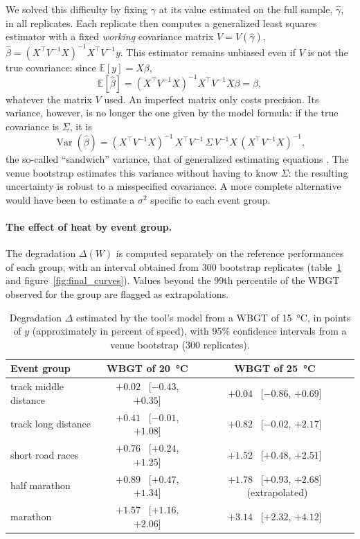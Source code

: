 \documentclass[11pt,a4paper]{article}
\newcommand{\E}{\mathbb{E}}
\DeclareMathOperator{\Var}{Var}
\begin{document}
We solved this difficulty by fixing $\gamma$ at its value estimated on the full sample, $\hat\gamma$, in all replicates.
Each replicate then computes a generalized least squares estimator with a fixed \emph{working} covariance matrix
$V = V(\hat\gamma)$, $\hat\beta = (X^\top V^{-1} X)^{-1} X^\top V^{-1} y$. This estimator remains unbiased even if $V$ is
not the true covariance: since $\E[y] = X\beta$,
\[
\E[\hat\beta] = (X^\top V^{-1} X)^{-1} X^\top V^{-1} X\beta = \beta,
\]
whatever the matrix $V$ used. An imperfect matrix only costs precision. Its variance, however, is no longer the one given
by the model formula: if the true covariance is $\Sigma$, it is
\[
\Var(\hat\beta) = (X^\top V^{-1} X)^{-1}\,X^\top V^{-1}\,\Sigma\,V^{-1} X\,(X^\top V^{-1} X)^{-1},
\]
the so-called ``sandwich'' variance, that of generalized estimating equations \citep{liang1986}. The venue bootstrap
estimates this variance without having to know $\Sigma$: the resulting uncertainty is robust to a misspecified
covariance. A more complete alternative would have been to estimate a $\sigma^2$ specific to each event group.

\paragraph{The effect of heat by event group.} The degradation $\Delta(W)$ is computed separately on the reference
performances of each group, with an interval obtained from 300 bootstrap replicates (table~\ref{tab:effects} and
figure~\ref{fig:final_curves}). Values beyond the 99th percentile of the WBGT observed for the group are flagged as
extrapolations.

\begin{table}[htbp]
\centering
\small
\caption{Degradation $\Delta$ estimated by the tool's model from a WBGT of 15~°C, in points of $y$ (approximately in
percent of speed), with 95\% confidence intervals from a venue bootstrap (300 replicates).}
\label{tab:effects}
\begin{tabular}{@{}lcc@{}}
\toprule
Event group & WBGT of 20~°C & WBGT of 25~°C \\
\midrule
track middle distance & $+0.02$ \ [$-0.43$, $+0.35$] & $+0.04$ \ [$-0.86$, $+0.69$] \\
track long distance & $+0.41$ \ [$-0.01$, $+1.08$] & $+0.82$ \ [$-0.02$, $+2.17$] \\
short road races & $+0.76$ \ [$+0.24$, $+1.25$] & $+1.52$ \ [$+0.48$, $+2.51$] \\
half marathon & $+0.89$ \ [$+0.47$, $+1.34$] & $+1.78$ \ [$+0.93$, $+2.68$] \ (extrapolated) \\
marathon & $+1.57$ \ [$+1.16$, $+2.06$] & $+3.14$ \ [$+2.32$, $+4.12$] \\
\bottomrule
\end{tabular}
\end{table}
\end{document}
